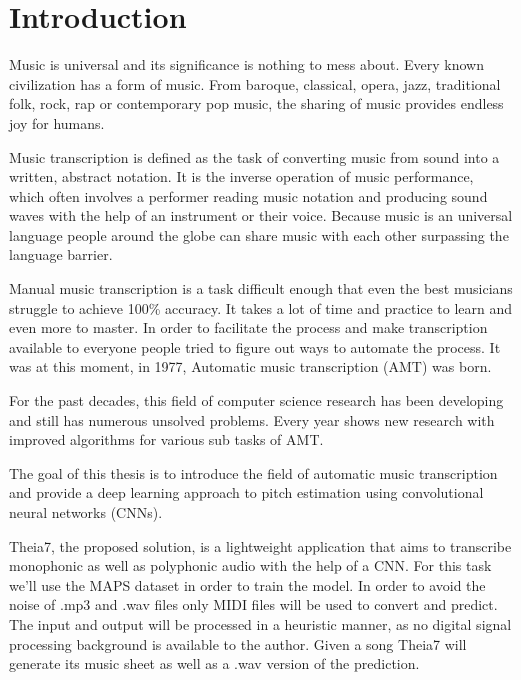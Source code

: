 \newpage
\section{Introduction}
Music is universal and its significance is nothing to mess about. Every known civilization has a form of music. From baroque, classical, opera, jazz, traditional folk, rock, rap or contemporary pop music, the sharing of music provides endless joy for humans.
\par
Music transcription is defined as the task of converting music from sound into a written, abstract notation.
It is the inverse operation of music performance, which often involves a performer reading music notation and producing sound waves with the help of an instrument or their voice. Because music is an universal language people around the globe can share music with each other surpassing the language barrier.
\par
Manual music transcription is a task difficult enough that even the best musicians struggle to achieve 100\% accuracy. It takes a lot of time and practice to learn and even more to master. In order to facilitate the process and make transcription available to everyone people tried to figure out ways to automate the process. It was at this moment, in 1977, Automatic music transcription (AMT) was born.
\par
For the past decades, this field of computer science research has been developing and still has numerous unsolved problems. Every year shows new research with improved algorithms for various sub tasks of AMT.
\par
The goal of this thesis is to introduce the field of automatic music transcription and provide a deep learning approach to pitch estimation using convolutional neural networks (CNNs).

\par
Theia7, the proposed solution, is a lightweight application that aims to transcribe monophonic as well as polyphonic audio with the help of a CNN. For this task we'll use the MAPS dataset\cite{maps} in order to train the model. In order to avoid the noise of .mp3 and .wav files only MIDI files will be used to convert and predict. The input and output will be processed in a heuristic manner, as no digital signal processing background is available to the author. Given a song Theia7 will generate its music sheet as well as a .wav version of the prediction. 

